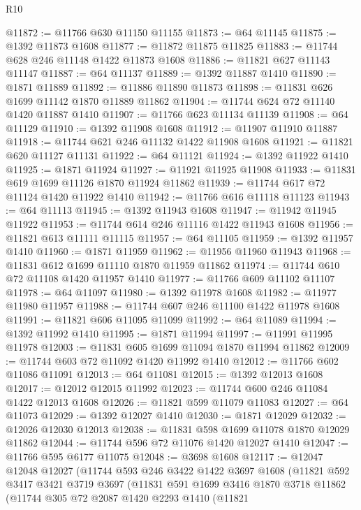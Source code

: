 \begin{lexlean}{R10}
\begin{coremodule}
@11872 := @11766 @630 @11150 @11155
@11873 := @64 @11145
@11875 := @1392 @11873 @1608
@11877 := @11872 @11875 @11825
@11883 := @11744 @628 @246 @11148 @1422 @11873 @1608
@11886 := @11821 @627 @11143 @11147
@11887 := @64 @11137
@11889 := @1392 @11887 @1410
@11890 := @1871 @11889
@11892 := @11886 @11890 @11873
@11898 := @11831 @626 @1699 @11142 @1870 @11889 @11862
@11904 := @11744 @624 @72 @11140 @1420 @11887 @1410
@11907 := @11766 @623 @11134 @11139
@11908 := @64 @11129
@11910 := @1392 @11908 @1608
@11912 := @11907 @11910 @11887
@11918 := @11744 @621 @246 @11132 @1422 @11908 @1608
@11921 := @11821 @620 @11127 @11131
@11922 := @64 @11121
@11924 := @1392 @11922 @1410
@11925 := @1871 @11924
@11927 := @11921 @11925 @11908
@11933 := @11831 @619 @1699 @11126 @1870 @11924 @11862
@11939 := @11744 @617 @72 @11124 @1420 @11922 @1410
@11942 := @11766 @616 @11118 @11123
@11943 := @64 @11113
@11945 := @1392 @11943 @1608
@11947 := @11942 @11945 @11922
@11953 := @11744 @614 @246 @11116 @1422 @11943 @1608
@11956 := @11821 @613 @11111 @11115
@11957 := @64 @11105
@11959 := @1392 @11957 @1410
@11960 := @1871 @11959
@11962 := @11956 @11960 @11943
@11968 := @11831 @612 @1699 @11110 @1870 @11959 @11862
@11974 := @11744 @610 @72 @11108 @1420 @11957 @1410
@11977 := @11766 @609 @11102 @11107
@11978 := @64 @11097
@11980 := @1392 @11978 @1608
@11982 := @11977 @11980 @11957
@11988 := @11744 @607 @246 @11100 @1422 @11978 @1608
@11991 := @11821 @606 @11095 @11099
@11992 := @64 @11089
@11994 := @1392 @11992 @1410
@11995 := @1871 @11994
@11997 := @11991 @11995 @11978
@12003 := @11831 @605 @1699 @11094 @1870 @11994 @11862
@12009 := @11744 @603 @72 @11092 @1420 @11992 @1410
@12012 := @11766 @602 @11086 @11091
@12013 := @64 @11081
@12015 := @1392 @12013 @1608
@12017 := @12012 @12015 @11992
@12023 := @11744 @600 @246 @11084 @1422 @12013 @1608
@12026 := @11821 @599 @11079 @11083
@12027 := @64 @11073
@12029 := @1392 @12027 @1410
@12030 := @1871 @12029
@12032 := @12026 @12030 @12013
@12038 := @11831 @598 @1699 @11078 @1870 @12029 @11862
@12044 := @11744 @596 @72 @11076 @1420 @12027 @1410
@12047 := @11766 @595 @6177 @11075
@12048 := @3698 @1608
@12117 := @12047
    @12048
    @12027
    (@11744
      @593
      @246
      @3422
      @1422
      @3697
      @1608
      (@11821
        @592
        @3417
        @3421
        @3719
        @3697
        (@11831
          @591
          @1699
          @3416
          @1870
          @3718
          @11862
          (@11744
            @305
            @72
            @2087
            @1420
            @2293
            @1410
            (@11821

\end{coremodule}
\end{lexlean}
